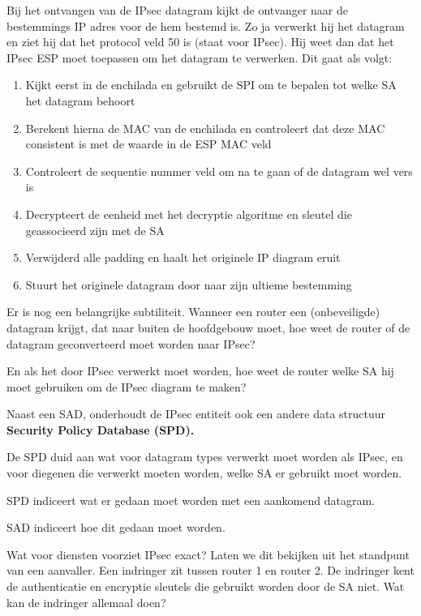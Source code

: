 \noindent Bij het ontvangen van de IPsec datagram kijkt de ontvanger naar de bestemmings IP adres voor de hem bestemd is. Zo ja verwerkt hij het datagram en ziet hij dat het protocol veld 50 is (staat voor IPsec). Hij weet dan dat het IPsec ESP moet toepassen om het datagram te verwerken. Dit gaat als volgt:
\begin{enumerate}

\item Kijkt eerst in de enchilada en gebruikt de SPI om te bepalen tot welke SA het datagram behoort
\item Berekent hierna de MAC van de enchilada en controleert dat deze MAC consistent is met de waarde in de ESP MAC veld
\item Controleert de sequentie nummer veld om na te gaan of de datagram wel vers is
\item Decrypteert de eenheid met het decryptie algoritme en sleutel die geassocieerd zijn met de SA
\item Verwijderd alle padding en haalt het originele IP diagram eruit
\item Stuurt het originele datagram door naar zijn ultieme bestemming
\end{enumerate}

\noindent Er is nog een belangrijke subtiliteit. Wanneer een router een (onbeveiligde) datagram krijgt, dat naar buiten de hoofdgebouw moet, hoe weet de router of de datagram geconverteerd moet worden naar IPsec?

En als het door IPsec verwerkt moet worden, hoe weet de router welke SA hij moet gebruiken om de IPsec diagram te maken?


Naast een SAD, onderhoudt de IPsec entiteit ook een andere data structuur \textbf{Security Policy Database (SPD). }

De SPD duid aan wat voor datagram types verwerkt moet worden als IPsec, en voor diegenen die verwerkt moeten worden, welke SA er gebruikt moet worden.


SPD indiceert wat er gedaan moet worden met een aankomend datagram.

SAD indiceert hoe dit gedaan moet worden.

\clearpage


\noindent Wat voor diensten voorziet IPsec exact? Laten we dit bekijken uit het standpunt van een aanvaller.
Een indringer zit tussen router 1 en router 2. De indringer kent de authenticatie en encryptie sleutels die gebruikt worden door de SA niet. Wat kan de indringer allemaal doen?

